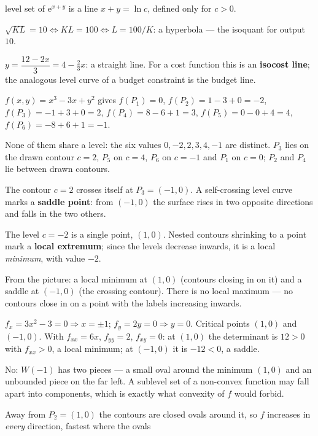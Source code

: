 \begin{solutions}
        level set of $\mathrm{e}^{x+y}$ is a line $x+y=\ln c$, defined only
        for $c>0$.
  \item $\sqrt{KL}=10\iff KL=100\iff L=100/K$: a hyperbola --- the
        isoquant for output $10$.
  \item $y=\dfrac{12-2x}{3}=4-\tfrac23x$: a straight line. For a cost
        function this is an \textbf{isocost line}; the analogous level
        curve of a budget constraint is the budget line.
  \item $f(x,y)=x^{3}-3x+y^{2}$ gives
        $f(P_{1})=0$, \;$f(P_{2})=1-3+0=-2$, \;$f(P_{3})=-1+3+0=2$,
        \;$f(P_{4})=8-6+1=3$, \;$f(P_{5})=0-0+4=4$,
        \;$f(P_{6})=-8+6+1=-1$.
  \item None of them share a level: the six values
        $0,-2,2,3,4,-1$ are distinct. $P_{3}$ lies on the drawn contour
        $c=2$, $P_{5}$ on $c=4$, $P_{6}$ on $c=-1$ and $P_{1}$ on $c=0$;
        $P_{2}$ and $P_{4}$ lie between drawn contours.
  \item The contour $c=2$ crosses itself at $P_{3}=(-1,0)$. A
        self-crossing level curve marks a \textbf{saddle point}: from
        $(-1,0)$ the surface rises in two opposite directions and falls in
        the two others.
  \item The level $c=-2$ is a single point, $(1,0)$. Nested contours
        shrinking to a point mark a \textbf{local extremum}; since the
        levels decrease inwards, it is a local \emph{minimum}, with value
        $-2$.
  \item From the picture: a local minimum at $(1,0)$ (contours closing in
        on it) and a saddle at $(-1,0)$ (the crossing contour). There is no
        local maximum --- no contours close in on a point with the labels
        increasing inwards.
  \item $f_{x}=3x^{2}-3=0\Rightarrow x=\pm1$; $f_{y}=2y=0\Rightarrow y=0$.
        Critical points $(1,0)$ and $(-1,0)$. With $f_{xx}=6x$,
        $f_{yy}=2$, $f_{xy}=0$: at $(1,0)$ the determinant is $12>0$ with
        $f_{xx}>0$, a local minimum; at $(-1,0)$ it is $-12<0$, a saddle.
  \item No: $W(-1)$ has two pieces --- a small oval around the minimum
        $(1,0)$ and an unbounded piece on the far left. A sublevel set of a
        non-convex function may fall apart into components, which is
        exactly what convexity of $f$ would forbid.
  \item Away from $P_{2}=(1,0)$ the contours are closed ovals around it, so
        $f$ increases in \emph{every} direction, fastest where the ovals

\end{solutions}
